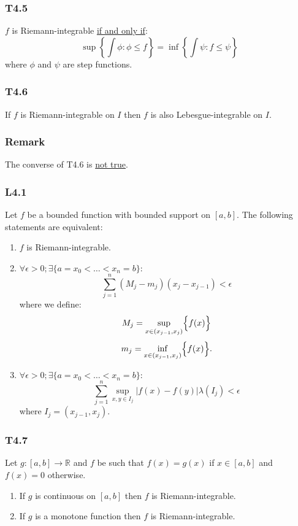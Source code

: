\documentclass{article}
\begin{document}
\begin{multicols*}{3}
\subsubsection*{T4.5}
$f$ is Riemann-integrable \underline{if and only if}:
$$\sup\left\{\int\phi:\phi\leq f\right\}
=\inf\left\{\int\psi:f\leq\psi\right\}$$
where $\phi$ and $\psi$ are step functions.

\subsubsection*{T4.6}
If $f$ is Riemann-integrable on $I$ then
$f$ is also Lebesgue-integrable on $I$.

\subsubsection*{Remark}
The converse of T4.6 is \underline{not true}.

\subsubsection*{L4.1}
Let $f$ be a bounded function with
bounded support on $[a,b]$.
The following statements are equivalent:
\begin{enumerate}
    \item $f$ is Riemann-integrable.

    \item $\forall\epsilon>0;
    \exists\{a=x_0<\dots<x_n=b\}:$
    $$\sum_{j=1}^{n}(M_j-m_j)(x_j-x_{j-1})<\epsilon$$
    where we define:
    $$M_j=\sup_{x\in(x_{j-1},x_j)}\Bigl\{f(x)\Bigr\}$$
    $$m_j=\inf_{x\in(x_{j-1},x_j)}\Bigl\{f(x)\Bigr\}.$$

    \item $\forall\epsilon>0;
    \exists\{a=x_0<\dots<x_n=b\}:$
    $$\sum_{j=1}^{n}\sup_{x,y\in I_j}
    |f(x)-f(y)|\lambda(I_j)<\epsilon$$
    where $I_j=(x_{j-1},x_j)$.
\end{enumerate}

\subsubsection*{T4.7}
Let $g:[a,b]\rightarrow\mathbb{R}$
and $f$ be such that $f(x)=g(x)$ if $x\in[a,b]$
and $f(x)=0$ otherwise.
\begin{enumerate}
    \item If $g$ is continuous on $[a,b]$
    then $f$ is Riemann-integrable.

    \item If $g$ is a monotone function
    then $f$ is Riemann-integrable.
\end{enumerate}


\end{multicols*}
\end{document}
